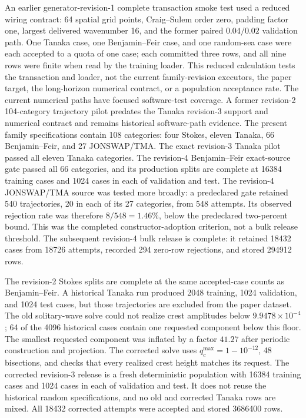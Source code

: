 An earlier generator-revision-1 complete transaction smoke test used a reduced
wiring contract:
64 spatial grid points, Craig--Sulem order zero, padding factor one, largest
delivered wavenumber 16, and the former paired \(0.04/0.02\) validation path.
One Tanaka case, one Benjamin--Feir case, and one random-sea case were each
accepted to a quota of one case; each committed three rows, and all nine rows
were finite when read by the training loader.  This reduced calculation tests
the transaction and loader, not the current family-revision executors, the
paper target, the long-horizon numerical contract, or a population acceptance
rate.  The current numerical paths have focused software-test coverage.
A former revision-2 104-category trajectory pilot predates the Tanaka
revision-3 support and numerical contract and remains historical software-path
evidence.  The present family specifications contain 108 categories: four
Stokes, eleven Tanaka, 66 Benjamin--Feir, and 27 JONSWAP/TMA.  The exact
revision-3 Tanaka pilot passed all eleven Tanaka categories.  The revision-4
Benjamin--Feir exact-source gate passed all 66 categories, and its production
splits are complete at 16384 training cases and 1024 cases in each of
validation and test.  The revision-4 JONSWAP/TMA source was tested more
broadly: a predeclared gate retained 540 trajectories, 20 in each of its 27
categories, from 548 attempts.  Its observed rejection rate was therefore
\(8/548=1.46\%\), below the predeclared two-percent bound.  This was the
completed constructor-adoption criterion, not a bulk release threshold.  The
subsequent revision-4 bulk release is complete: it retained \num{18432} cases
from \num{18726} attempts, recorded \num{294} zero-row rejections, and stored
\num{294912} rows.

The revision-2 Stokes splits are complete at the same accepted-case counts as
Benjamin--Feir.  A historical Tanaka run produced 2048 training, 1024
validation, and 1024 test cases, but those trajectories are excluded from the
paper dataset.  The old solitary-wave solve could not realize crest amplitudes
below \(9.9478\times10^{-4}\); 64 of the 4096 historical cases contain one
requested component below this floor.  The smallest requested component was
inflated by a factor \(41.27\) after periodic construction and projection.
The corrected solve uses \(q_c^{\max}=1-10^{-12}\), 48 bisections, and checks
that every realized crest height matches its request.  The corrected
revision-3 release is a fresh deterministic population with 16384
training cases and 1024 cases in each of validation and test.  It does not
reuse the historical random specifications, and no old and corrected Tanaka
rows are mixed.  All \num{18432} corrected attempts were accepted and stored
\num{3686400} rows.

